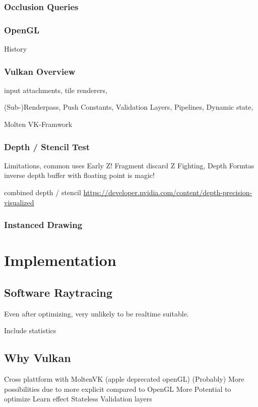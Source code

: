 \subsubsection{Occlusion Queries}

\subsubsection{OpenGL}
History

\subsubsection{Vulkan Overview}
input attachments, tile renderers,

(Sub-)Renderpass, Push Constants, Validation Layers, Pipelines, Dynamic state,

Molten VK-Framwork

\subsubsection{Depth / Stencil Test}
Limitations, common uses
Early Z! Fragment discard
Z Fighting,
Depth Formtas
inverse depth buffer with floating point is magic!

combined depth / stencil
\url{https://developer.nvidia.com/content/depth-precision-visualized}


\subsubsection{Instanced Drawing}

\section{Implementation}

\subsection{Software Raytracing}
Even after optimizing, very unlikely to be realtime suitable. 

Include statistics

\subsection{Why Vulkan}
Cross plattform with MoltenVK (apple deprecated openGL)
(Probably) More possibilities due to more explicit compared to OpenGL
More Potential to optimize
Learn effect
Stateless
Validation layers

